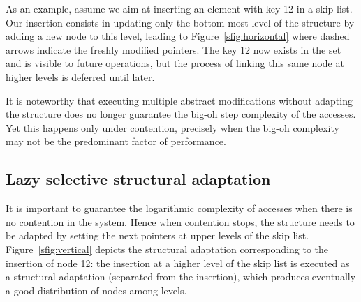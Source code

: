 As an example, assume we aim at inserting an element with key 12 in a skip list.  Our 
insertion consists in updating only the bottom most level of the structure by
adding a new node to this level, leading to Figure~\ref{sfig:horizontal} where dashed arrows indicate the freshly modified pointers.
The key 12 now exists in the set and is visible to future operations, but
the process of linking this same node at higher levels is deferred until later.

%

It is noteworthy that executing multiple abstract modifications without adapting the structure
does no longer guarantee the big-oh step complexity of the accesses. Yet this happens only under 
contention, precisely when the big-oh complexity may not be the predominant factor of 
performance.

\subsection{Lazy selective structural adaptation}



It is important to guarantee the logarithmic complexity of accesses when there is no contention
in the system. Hence when contention stops, the structure needs to be adapted by setting the 
next pointers at upper levels of the skip list.
Figure~\ref{sfig:vertical} depicts the structural adaptation corresponding to the insertion of node 12: the 
insertion at a higher level of the skip list is executed as a structural adaptation (separated from the 
insertion), which produces eventually a good distribution of nodes among levels.


